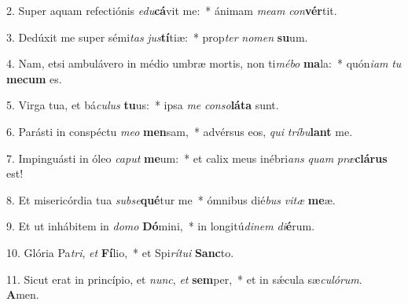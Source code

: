 2. Super aquam refectiónis \textit{e}\textit{du}\textbf{cá}vit me:~*  ánimam \textit{me}\textit{am} \textit{con}\textbf{vér}tit.\

3. Dedúxit me super sémi\textit{tas} \textit{jus}\textbf{tí}tiæ:~*  prop\textit{ter} \textit{no}\textit{men} \textbf{su}um.\

4. Nam, etsi ambulávero in médio umbræ mortis, non ti\textit{mé}\textit{bo} \textbf{ma}la:~*  quón\textit{i}\textit{am} \textit{tu} \textbf{me}\textbf{cum} es.\

5. Virga tua, et bá\textit{cu}\textit{lus} \textbf{tu}us:~*  ipsa \textit{me} \textit{con}\textit{so}\textbf{lá}\textbf{ta} sunt.\

6. Parásti in conspéctu \textit{me}\textit{o} \textbf{men}sam,~*  advérsus eos, \textit{qui} \textit{trí}\textit{bu}\textbf{lant} me.\

7. Impinguásti in óleo \textit{ca}\textit{put} \textbf{me}um:~*  et calix meus inébri\textit{ans} \textit{quam} \textit{præ}\textbf{clá}\textbf{rus} est!\

8. Et misericórdia tua \textit{sub}\textit{se}\textbf{qué}tur me~*  ómnibus dié\textit{bus} \textit{vi}\textit{tæ} \textbf{me}æ.\

9. Et ut inhábitem in \textit{do}\textit{mo} \textbf{Dó}mini,~*  in longitú\textit{di}\textit{nem} \textit{di}\textbf{é}rum.\

10. Glória Pa\textit{tri}, \textit{et} \textbf{Fí}lio,~*  et Spi\textit{rí}\textit{tu}\textit{i} \textbf{Sanc}to.\

11. Sicut erat in princípio, et \textit{nunc}, \textit{et} \textbf{sem}per,~*  et in sǽcula sæ\textit{cu}\textit{ló}\textit{rum}. \textbf{A}men.\

